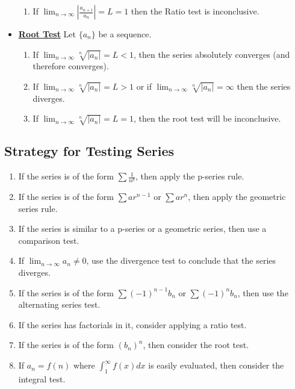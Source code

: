 \documentclass[reqno,11pt]{amsart}
\theoremstyle{definition}
\theoremstyle{remark}
\newcommand{\dfn}[1]{\underline{\textbf{#1}}}
\begin{document}
\begin{itemize}[noitemsep]
\begin{enumerate}[noitemsep]
		\item If $\lim_{n \rightarrow \infty} \left| \frac{a_{n+1}}{a_n} \right| = L = 1$ then the Ratio test is inconclusive. 
	\end{enumerate}
	\item \dfn{Root Test} Let $\{ a_n \}$ be a sequence. 
	\begin{enumerate}[noitemsep]
		\item If $\lim_{n \rightarrow \infty} \sqrt[n]{|a_n|} = L < 1$, then the series absolutely converges (and therefore converges). 
		\item If $\lim_{n \rightarrow \infty} \sqrt[n]{|a_n|} = L > 1$ or if $\lim_{n \rightarrow \infty} \sqrt[n]{|a_n|} = \infty$ then the series diverges. 
		\item If $\lim_{n \rightarrow \infty} \sqrt[n]{|a_n|} = L = 1$, then the root test will be inconclusive. 
	\end{enumerate}
\end{itemize}
\subsection{Strategy for Testing Series}
\begin{enumerate}[noitemsep]
	\item If the series is of the form $\sum \frac{1}{n^p}$, then apply the p-series rule. 
	\item If the series is of the form $\sum ar^{n-1}$ or $\sum ar^n$, then apply the geometric series rule. 
	\item If the series is similar to a p-series or a geometric series, then use a comparison test. 
	\item If $\lim_{n \rightarrow \infty} a_n \neq 0$, use the divergence test to conclude that the series diverges. 
	\item If the series is of the form $\sum (-1)^{n-1} b_n$ or $\sum (-1)^n b_n$, then use the alternating series test. 
	\item If the series has factorials in it, consider applying a ratio test. 
	\item If the series is of the form $(b_n)^n$, then consider the root test. 
	\item If $a_n = f(n)$ where $\int_1^\infty f(x) dx$ is easily evaluated, then consider the integral test.
\end{enumerate}
\end{document}
